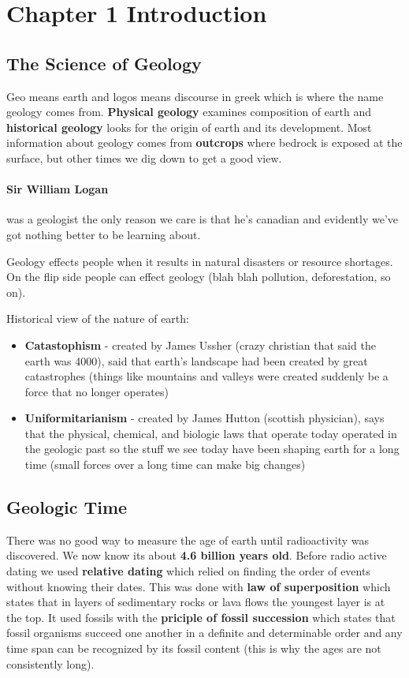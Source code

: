 \documentclass{article}
\begin{document}
\section{Chapter 1 Introduction} %
\label{sec:chapter_1}
\subsection{The Science of Geology} %
\label{sub:the_science_of_geology}
Geo means earth and logos means discourse in greek which is where the name geology comes from. \textbf{Physical geology} examines composition of earth and \textbf{historical geology} looks for the origin of earth and its development. Most information about geology comes from \textbf{outcrops} where bedrock is exposed at the surface, but other times we dig down to get a good view.

\paragraph{Sir William Logan} was a geologist the only reason we care is that he's canadian and evidently we've got nothing better to be learning about.

Geology effects people when it results in natural disasters or resource shortages. On the flip side people can effect geology (blah blah pollution, deforestation, so on).

Historical view of the nature of earth:
\begin{itemize}
    \item \textbf{Catastophism} - created by James Ussher (crazy christian that said the earth was 4000), said that earth's landscape had been created by great catastrophes (things like mountains and valleys were created suddenly be a force that no longer operates)
    \item \textbf{Uniformitarianism} - created by James Hutton (scottish physician), says that the physical, chemical, and biologic laws that operate today operated in the geologic past so the stuff we see today have been shaping earth for a long time (small forces over a long time can make big changes)
\end{itemize}

\subsection{Geologic Time} %
\label{sub:geologic_time}
There was no good way to measure the age of earth until radioactivity was discovered. We now know its about \textbf{4.6 billion years old}. Before radio active dating we used \textbf{relative dating} which relied on finding the order of events without knowing their dates. This was done with \textbf{law of superposition} which states that in layers of sedimentary rocks or lava flows the youngest layer is at the top. It used fossils with the \textbf{priciple of fossil succession} which states that fossil organisms succeed one another in a definite and determinable order and any time span can be recognized by its fossil content (this is why the ages are not consistently long).
\end{document}
